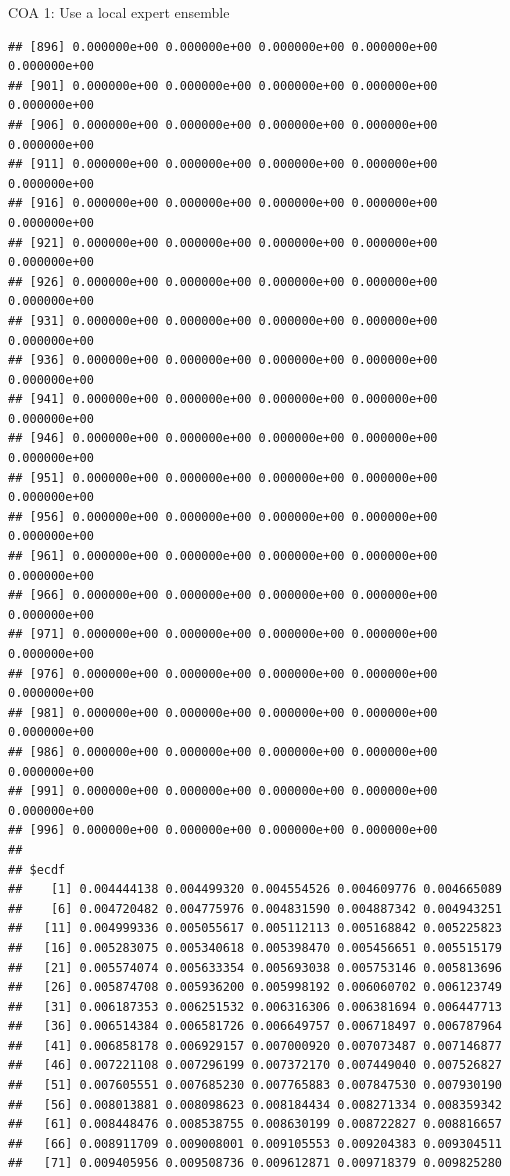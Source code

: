 \documentclass[ignorenonframetext,]{beamer}
\begin{document}
\begin{frame}[fragile]{COA 1: Use a local expert ensemble}
\begin{verbatim}
## [896] 0.000000e+00 0.000000e+00 0.000000e+00 0.000000e+00 0.000000e+00
## [901] 0.000000e+00 0.000000e+00 0.000000e+00 0.000000e+00 0.000000e+00
## [906] 0.000000e+00 0.000000e+00 0.000000e+00 0.000000e+00 0.000000e+00
## [911] 0.000000e+00 0.000000e+00 0.000000e+00 0.000000e+00 0.000000e+00
## [916] 0.000000e+00 0.000000e+00 0.000000e+00 0.000000e+00 0.000000e+00
## [921] 0.000000e+00 0.000000e+00 0.000000e+00 0.000000e+00 0.000000e+00
## [926] 0.000000e+00 0.000000e+00 0.000000e+00 0.000000e+00 0.000000e+00
## [931] 0.000000e+00 0.000000e+00 0.000000e+00 0.000000e+00 0.000000e+00
## [936] 0.000000e+00 0.000000e+00 0.000000e+00 0.000000e+00 0.000000e+00
## [941] 0.000000e+00 0.000000e+00 0.000000e+00 0.000000e+00 0.000000e+00
## [946] 0.000000e+00 0.000000e+00 0.000000e+00 0.000000e+00 0.000000e+00
## [951] 0.000000e+00 0.000000e+00 0.000000e+00 0.000000e+00 0.000000e+00
## [956] 0.000000e+00 0.000000e+00 0.000000e+00 0.000000e+00 0.000000e+00
## [961] 0.000000e+00 0.000000e+00 0.000000e+00 0.000000e+00 0.000000e+00
## [966] 0.000000e+00 0.000000e+00 0.000000e+00 0.000000e+00 0.000000e+00
## [971] 0.000000e+00 0.000000e+00 0.000000e+00 0.000000e+00 0.000000e+00
## [976] 0.000000e+00 0.000000e+00 0.000000e+00 0.000000e+00 0.000000e+00
## [981] 0.000000e+00 0.000000e+00 0.000000e+00 0.000000e+00 0.000000e+00
## [986] 0.000000e+00 0.000000e+00 0.000000e+00 0.000000e+00 0.000000e+00
## [991] 0.000000e+00 0.000000e+00 0.000000e+00 0.000000e+00 0.000000e+00
## [996] 0.000000e+00 0.000000e+00 0.000000e+00 0.000000e+00
## 
## $ecdf
##    [1] 0.004444138 0.004499320 0.004554526 0.004609776 0.004665089
##    [6] 0.004720482 0.004775976 0.004831590 0.004887342 0.004943251
##   [11] 0.004999336 0.005055617 0.005112113 0.005168842 0.005225823
##   [16] 0.005283075 0.005340618 0.005398470 0.005456651 0.005515179
##   [21] 0.005574074 0.005633354 0.005693038 0.005753146 0.005813696
##   [26] 0.005874708 0.005936200 0.005998192 0.006060702 0.006123749
##   [31] 0.006187353 0.006251532 0.006316306 0.006381694 0.006447713
##   [36] 0.006514384 0.006581726 0.006649757 0.006718497 0.006787964
##   [41] 0.006858178 0.006929157 0.007000920 0.007073487 0.007146877
##   [46] 0.007221108 0.007296199 0.007372170 0.007449040 0.007526827
##   [51] 0.007605551 0.007685230 0.007765883 0.007847530 0.007930190
##   [56] 0.008013881 0.008098623 0.008184434 0.008271334 0.008359342
##   [61] 0.008448476 0.008538755 0.008630199 0.008722827 0.008816657
##   [66] 0.008911709 0.009008001 0.009105553 0.009204383 0.009304511
##   [71] 0.009405956 0.009508736 0.009612871 0.009718379 0.009825280

\end{verbatim}
\end{frame}
\end{document}
